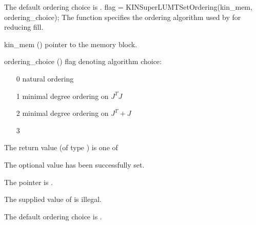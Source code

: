 {
  The default ordering choice is .
}
{
  flag = KINSuperLUMTSetOrdering(kin\_mem, ordering\_choice);
}
{
  The function  specifies the ordering algorithm
  used by {\kinsuperlumt} for reducing fill.
}
{
  \begin{args}
  \item[kin\_mem] ()
    pointer to the {\kinsol} memory block.
  \item[ordering\_choice] ()
    flag denoting algorithm choice:
    \begin{itemize}
    \item[0] natural ordering
    \item[1] minimal degree ordering on $J^TJ$
    \item[2] minimal degree ordering on $J^T + J$
    \item[3] 
    \end{itemize}
  \end{args}
}
{
  The return value  (of type ) is one of
  \begin{args}
  \item[\Id{KINSLS\_SUCCESS}] 
    The optional value has been successfully set.
  \item[\Id{KINSLS\_MEM\_NULL}]
    The  pointer is .
  \item[\Id{KINSLS\_ILL\_INPUT}]
    The supplied value of  is illegal.
  \end{args}
}
{
  The default ordering choice is .
}

